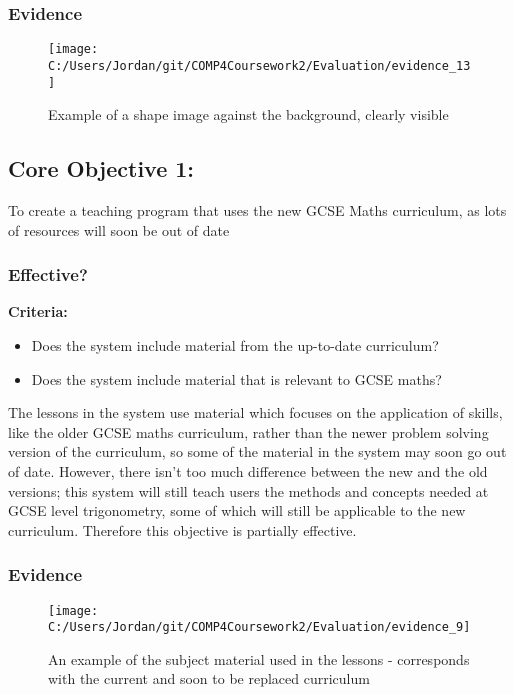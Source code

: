 \subsubsection{Evidence}

\begin{figure}[H]
	\texttt{[image: C:/Users/Jordan/git/COMP4Coursework2/Evaluation/evidence\_13]}
	\caption{Example of a shape image against the background, clearly visible}
\end{figure}

\subsection{Core Objective 1: }

To create a teaching program that uses the new GCSE Maths curriculum, as lots of resources will soon be out of date

\subsubsection{Effective?}

\textbf{Criteria: }

\begin{itemize}
	\item Does the system include material from the up-to-date curriculum?
	\item Does the system include material that is relevant to GCSE maths?
\end{itemize}

The lessons in the system use material which focuses on the application of skills, like the older GCSE maths curriculum, rather than the newer problem solving version of the curriculum, so some of the material in the system may soon go out of date. However, there isn't too much difference between the new and the old versions; this system will still teach users the methods and concepts needed at GCSE level trigonometry, some of which will still be applicable to the new curriculum. Therefore this objective is partially effective.

\subsubsection{Evidence}

\begin{figure}[H]
	\texttt{[image: C:/Users/Jordan/git/COMP4Coursework2/Evaluation/evidence\_9]}
	\caption{An example of the subject material used in the lessons - corresponds with the current and soon to be replaced curriculum}
\end{figure}

